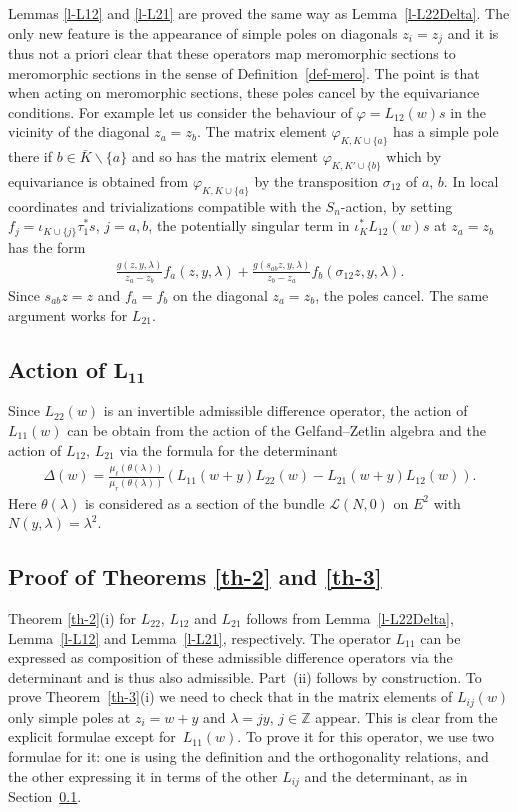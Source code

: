 \documentclass[pdftex]{sigma}
\numberwithin{equation}{section}
\begin{document}
Lemmas \ref{l-L12} and \ref{l-L21} are proved the same way as Lemma~\ref{l-L22Delta}. The only new feature is the appearance of simple poles on diagonals $z_i=z_j$ and it is thus not a priori clear that these operators map meromorphic sections to meromorphic sections in the sense of Definition~\ref{def-mero}. The point is that when acting on meromorphic sections, these poles cancel by the equivariance conditions. For example let us consider the behaviour of $\varphi=L_{12}(w)s$ in the vicinity of the diagonal $z_a=z_b$. The matrix element $\varphi_{K,K\cup\{a\}}$ has a simple pole there if $b\in \bar K\smallsetminus\{a\}$ and so has the matrix element $\varphi_{K,K'\cup\{b\}}$ which by equivariance is obtained from $\varphi_{K,K\cup\{a\}}$ by the transposition $\sigma_{12}$ of $a$, $b$. In local coordinates and trivializations compatible with the $S_n$-action, by setting $f_j=\iota_{K\cup\{j\}}\tau^*_1s$, $j=a,b$, the potentially singular term in $\iota_K^*L_{12}(w)s$ at $z_a=z_b$ has the form
\begin{gather*}
 \frac {g(z,y,\lambda)}{z_a-z_b}f_a(z,y,\lambda) +\frac{g(s_{ab}z,y,\lambda)}{z_b-z_a}f_b(\sigma_{12}z,y,\lambda).
\end{gather*}
Since $s_{ab}z=z$ and $f_a=f_b$ on the diagonal $z_a=z_b$, the poles cancel. The same argument works for $L_{21}$.

\subsection[Action of $L_{11}$]{Action of $\boldsymbol{L_{11}}$}\label{ss-6.3}
Since $L_{22}(w)$ is an invertible admissible difference operator, the action of $L_{11}(w)$ can be obtain from the action of the Gelfand--Zetlin algebra and the action of $L_{12}$, $L_{21}$ via the formula for the determinant
\begin{gather}\label{e-determinant}
 \Delta(w)=\frac{\mu_\ell(\theta(\lambda))}{\mu_r(\theta(\lambda))} (L_{11}(w+y)L_{22}(w)-L_{21}(w+y)L_{12}(w)).
\end{gather} Here $\theta(\lambda)$ is considered as a section of the bundle $\mathcal L(N,0)$ on $E^2$ with $N(y,\lambda)=\lambda^2$.

\subsection{Proof of Theorems \ref{th-2} and \ref{th-3}}\label{ss-6.4}
Theorem \ref{th-2}(i) for $L_{22}$, $L_{12}$ and $L_{21}$ follows from Lemma~\ref{l-L22Delta}, Lemma~\ref{l-L12} and Lemma~\ref{l-L21}, respectively. The operator $L_{11}$ can be expressed as composition of these admissible difference operators via the determinant and is thus also admissible. Part~(ii) follows by construction. To prove Theorem~\ref{th-3}(i) we need to check that in the matrix elements of $L_{ij}(w)$ only simple poles at $z_i=w+y$ and $\lambda=jy$, $j\in\mathbb Z$ appear. This is clear from the explicit formulae except for~$L_{11}(w)$. To prove it for this operator, we use two formulae for it: one is using the definition and the orthogonality relations, and the other expressing it in terms of the other $L_{ij}$ and the determinant, as in Section~\ref{ss-6.3}.
\end{document}
